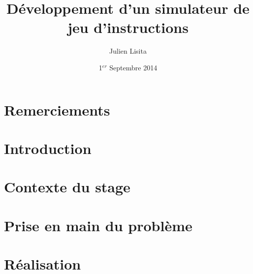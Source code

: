 \documentclass[a4paper,11pt]{article}
\begin{document}
\setlength{\parskip}{0.5em}%
\baselineskip 14pt


\title{\bf \huge Développement d'un simulateur de jeu d'instructions}
\author{Julien Lisita}
\date{1$^{er}$ Septembre 2014}

\maketitle

\newpage


\section{Remerciements}


\tableofcontents {}
\listoffigures


\section{Introduction}
\label{introduction}

\section{Contexte du stage}

\section{Prise en main du problème}

\section{Réalisation}

\end{document}

